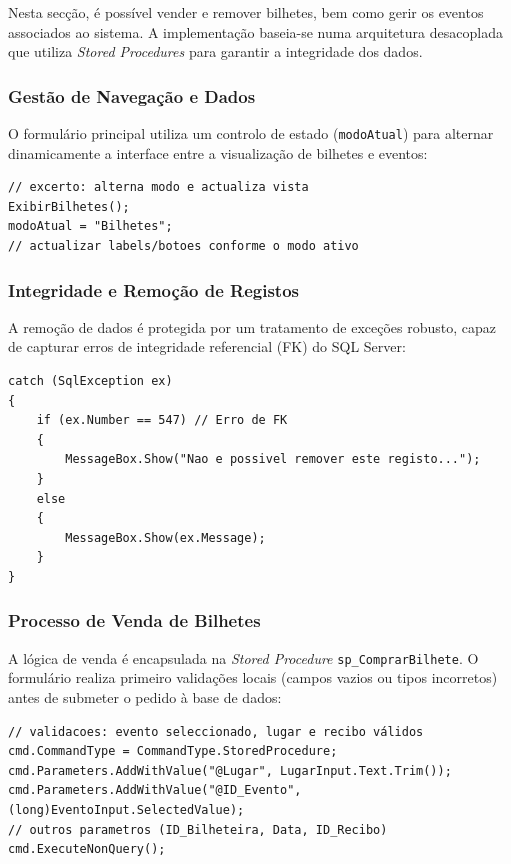 \documentclass[11pt,a4paper]{article}
\begin{document}
Nesta secção, é possível vender e remover bilhetes, bem como gerir os eventos associados ao sistema. A implementação baseia-se numa arquitetura desacoplada que utiliza \textit{Stored Procedures} para garantir a integridade dos dados.

\subsubsection{Gestão de Navegação e Dados}
O formulário principal utiliza um controlo de estado (\texttt{modoAtual}) para alternar dinamicamente a interface entre a visualização de bilhetes e eventos:

\begin{lstlisting}[language={[Sharp]C}, caption=Gestão de estados (excerto)]
// excerto: alterna modo e actualiza vista
ExibirBilhetes();
modoAtual = "Bilhetes";
// actualizar labels/botoes conforme o modo ativo
\end{lstlisting}

\subsubsection{Integridade e Remoção de Registos}
A remoção de dados é protegida por um tratamento de exceções robusto, capaz de capturar erros de integridade referencial (FK) do SQL Server:

\begin{lstlisting}[language={[Sharp]C}, caption=Tratamento de exceções e integridade referencial]
catch (SqlException ex)
{
    if (ex.Number == 547) // Erro de FK
    {
        MessageBox.Show("Nao e possivel remover este registo...");
    }
    else
    {
        MessageBox.Show(ex.Message);
    }
}
\end{lstlisting}

\subsubsection{Processo de Venda de Bilhetes}
A lógica de venda é encapsulada na \textit{Stored Procedure} \texttt{sp\_ComprarBilhete}. O formulário realiza primeiro validações locais (campos vazios ou tipos incorretos) antes de submeter o pedido à base de dados:

\begin{lstlisting}[language={[Sharp]C}, caption=Venda de bilhete (excerto)]
// validacoes: evento seleccionado, lugar e recibo válidos
cmd.CommandType = CommandType.StoredProcedure;
cmd.Parameters.AddWithValue("@Lugar", LugarInput.Text.Trim());
cmd.Parameters.AddWithValue("@ID_Evento", (long)EventoInput.SelectedValue);
// outros parametros (ID_Bilheteira, Data, ID_Recibo)
cmd.ExecuteNonQuery();
\end{lstlisting}
\end{document}
